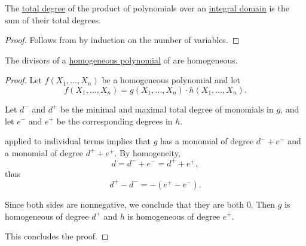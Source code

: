 \begin{proposition}\label{thm:degree_of_multivariate_polynomial_product}
  The \hyperref[def:polynomial_degree]{total degree} of the product of polynomials over an \hyperref[def:integral_domain]{integral domain} is the sum of their total degrees.
\end{proposition}
\begin{proof}
  Follows from  by induction on the number of variables.
\end{proof}

\begin{proposition}\label{thm:divisors_of_homogeneous_polynomial}
  The divisors of a \hyperref[def:homogeneous_polynomial]{homogeneous polynomial} of are homogeneous.
\end{proposition}
\begin{proof}
  Let \( f(X_1, \ldots, X_n) \) be a homogeneous polynomial and let
  \begin{equation*}
    f(X_1, \ldots, X_n) = g(X_1, \ldots, X_n) \cdot h(X_1, \ldots, X_n).
  \end{equation*}

  Let \( d^- \) and \( d^+ \) be the minimal and maximal total degree of monomials in \( g \), and let \( e^- \) and \( e^+ \) be the corresponding degrees in \( h \).

   applied to individual terms implies that \( g \) has a monomial of degree \( d^- + e^- \) and a monomial of degree \( d^+ + e^+ \). By homogeneity,
  \begin{equation*}
    d = d^- + e^- = d^+ + e^+,
  \end{equation*}
  thus
  \begin{equation*}
    d^+ - d^- = - (e^+ - e^-).
  \end{equation*}

  Since both sides are nonnegative, we conclude that they are both \( 0 \). Then \( g \) is homogeneous of degree \( d^+ \) and \( h \) is homogeneous of degree \( e^+ \).

  This concludes the proof.
\end{proof}

